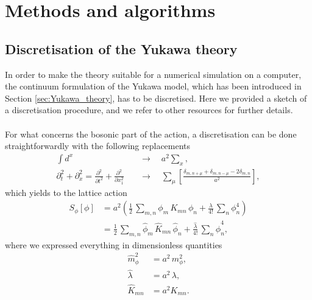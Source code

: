 
\chapter{Methods and algorithms}
\label{chapt:methods}

\section{Discretisation of the Yukawa theory}
\label{sec:lattice_discretisation}
In order to make the theory suitable for a numerical simulation on a computer, the continuum formulation of the Yukawa model, which has been introduced in Section \ref{sec:Yukawa_theory}, has to be discretised. Here we provided a sketch of a discretisation procedure, and we refer to other resources \cite{rothe_LGT,gattringer_LQCD,creutz_2023,Montvay1994QuantumLattice} for further details. \\~\\
For what concerns the bosonic part of the action, a discretisation can be done straightforwardly with the following replacements
\begin{equation*}
    \begin{aligned}
        \int d^x \quad &\to \quad a^2 \sum_x, \\
        \partial^2_t + \partial^2_x = \frac{\partial^2}{\partial t^2} + \frac{\partial^2}{\partial x_1^2} \quad &\to \quad \sum_\mu \left[\frac{\delta_{m,n+\mu} + \delta_{m,n-\mu} - 2 \delta_{m,n}}{a^2}\right],
    \end{aligned}
\end{equation*}
which yields to the lattice action
\begin{equation*}
        \begin{aligned} 
        		S_\phi [\phi] 	&=  a^2 \left( \frac{1}{2} \, \sum_{m,n} \phi_m \, K_{mn} \, \phi_n + \frac{\lambda}{4!} \, \sum_n \phi_n^4 \right)\\
        					&=  \frac{1}{2} \, \sum_{m,n} \hat{\phi}_m \, \widehat{K}_{mn} \, \hat{\phi}_n + \frac{\hat{\lambda}}{4!} \, \sum_n \hat{\phi}_n^4,
	\end{aligned}
\end{equation*}
where we expressed everything in dimensionless quantities
\begin{equation}
    \begin{aligned}
        \hat m_\phi^2 &= a^2 \, m_\phi^2, \\
        \hat \lambda &= a^{2} \, \lambda, \\
        \widehat{K}_{mn} &= a^2 K_{mn}.
    \end{aligned}
    \label{eq:couplings_redefinition}
\end{equation}
